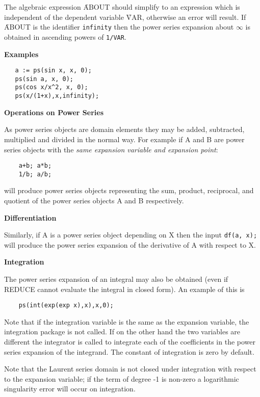 The algebraic expression \f{ABOUT} should simplify to an expression
which is independent of the dependent variable \f{VAR}, otherwise
an error will result.  If \f{ABOUT} is the identifier \texttt{infinity}
then the power series expansion about $\infty$ is obtained in ascending
powers of \texttt{1/VAR}.

\textbf{Examples}
\begin{verbatim}
   a := ps(sin x, x, 0);
   ps(sin a, x, 0);
   ps(cos x/x^2, x, 0);
   ps(x/(1+x),x,infinity);
\end{verbatim}

\textbf{Operations on Power Series}

As power series objects are domain elements they may be added, subtracted,
multiplied and divided in the normal way. For example if A and B are power
series objects with the \emph{same expansion variable and expansion point}:
\begin{verbatim}
    a+b; a*b;
    1/b; a/b;
\end{verbatim}

will produce power series objects representing the sum, product, reciprocal,
and quotient of the power series objects A and B
respectively.

\textbf{Differentiation}

Similarly, if A is a power series object depending on X then the input
{\tt df(a, x);} will produce the power series expansion of the
derivative of A with respect to X.

\textbf{Integration}

The power series expansion of an integral may also be obtained (even if
REDUCE cannot evaluate the integral in closed form).  An example of
this is

\begin{verbatim}
    ps(int(exp(exp x),x),x,0);
\end{verbatim}

Note that if the integration variable is the same as the expansion
variable, the integration package is not called. If on the
other hand the two variables are different the integrator is
called to integrate each of the coefficients in the power series
expansion of the integrand.  The constant of integration is zero by
default.

Note that the Laurent series domain is not closed under integration with
respect to the expansion variable; if the term of degree -1 is non-zero a
logarithmic singularity error will occur on integration.

